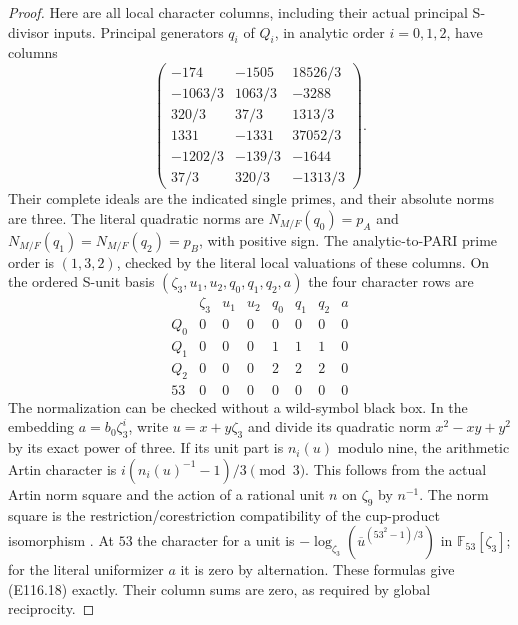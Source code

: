 \begin{proof}
Here are all local character columns, including their
actual principal S-divisor inputs. Principal generators
$q_i$ of $Q_i$, in analytic order $i=0,1,2$, have columns
\[
 \begin{pmatrix}
 -174&-1505&18526/3\\
 -1063/3&1063/3&-3288\\
 320/3&37/3&1313/3\\
 1331&-1331&37052/3\\
 -1202/3&-139/3&-1644\\
 37/3&320/3&-1313/3
 \end{pmatrix}.
 \tag{E116.17}
\]
Their complete ideals are the indicated single primes,
and their absolute norms are three. The literal quadratic
norms are $N_{M/F}(q_0)=p_A$ and
$N_{M/F}(q_1)=N_{M/F}(q_2)=p_B$, with positive sign.
The analytic-to-PARI
prime order is $(1,3,2)$, checked by the literal local
valuations of these columns. On the ordered S-unit basis
$(\zeta_3,u_1,u_2,q_0,q_1,q_2,a)$ the four character rows are
\[
 \begin{array}{c|rrrrrrr}
       &\zeta_3&u_1&u_2&q_0&q_1&q_2&a\\ \hline
 Q_0&0&0&0&0&0&0&0\\
 Q_1&0&0&0&1&1&1&0\\
 Q_2&0&0&0&2&2&2&0\\
 53 &0&0&0&0&0&0&0
 \end{array}
 \tag{E116.18}
\]
The normalization can be checked without a wild-symbol
black box. In the embedding $a=b_0\zeta_3^i$, write
$u=x+y\zeta_3$ and divide its quadratic norm
$x^2-xy+y^2$ by its exact power of three. If its unit
part is $n_i(u)$ modulo nine, the arithmetic Artin
character is
$i(n_i(u)^{-1}-1)/3\pmod3$.
This follows from the actual Artin norm square and the
action of a rational unit $n$ on $\zeta_9$ by $n^{-1}$.
The norm square is the restriction/corestriction
compatibility of the cup-product isomorphism
\cite[III,Theorem 3.1 and its proof]{E_MilneCFT}.
At $53$ the character for a unit is
$-\log_{\zeta_3}(\overline u^{(53^2-1)/3})$ in
$\mathbb F_{53}[\zeta_3]$; for the literal uniformizer
$a$ it is zero by alternation. These formulas give
(E116.18) exactly. Their column sums are zero, as
required by global reciprocity.


\end{proof}
